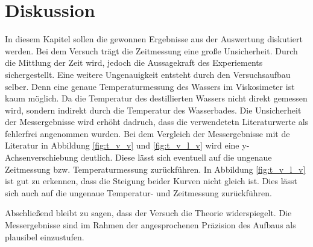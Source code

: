 \section{Diskussion}
In diesem Kapitel sollen die gewonnen Ergebnisse
aus der Auswertung diskutiert werden.
Bei dem Versuch trägt die Zeitmessung 
eine große Unsicherheit.
Durch die Mittlung der Zeit wird, jedoch die Aussagekraft des
Experiements sichergestellt.%
Eine weitere Ungenauigkeit entsteht durch den Versuchsaufbau selber. %
Denn eine genaue Temperaturmessung des Wassers im Viskosimeter
ist kaum möglich.
Da die Temperatur des destillierten Wassers nicht direkt gemessen wird,
sondern indirekt durch die Temperatur des Wasserbades. %
Die Unsicherheit der Messergebnisse wird erhöht dadruch, dass
die verwendetetn Literaturwerte als fehlerfrei angenommen wurden.  %
Bei dem Vergleich der Messergebnisse mit de Literatur in Abbildung
\ref{fig:t_v_v} und \ref{fig:t_v_l_v} wird eine y-Achsenverschiebung deutlich.
Diese lässt sich eventuell auf die ungenaue Zeitmessung bzw. Temperaturmessung zurückführen.
In Abbildung \ref{fig:t_v_l_v} ist gut zu erkennen, dass die Steigung beider
Kurven nicht gleich ist. %
Dies lässt sich auch auf die ungenaue Temperatur- und Zeitmessung zurückführen.%

Abschließend bleibt zu sagen, dass der Versuch die Theorie widerspiegelt. %
Die Messergebnisse sind im Rahmen der angesprochenen Präzision des Aufbaus als plausibel einzustufen.
